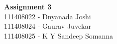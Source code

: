 \documentclass[main.tex]{subfiles}
\begin{document}
\begin{titlepage}

\begin{center}
  \LARGE{\bf{Assignment 3\\}}
  \horrule{0.4pt}
  111408022 - Dnyanada Joshi \\
  111408024 - Gaurav Juvekar \\
  111408025 - K Y Sandeep Somanna \\
\end{center}
\horrule{0.4pt}
\end{titlepage}
\end{document}
